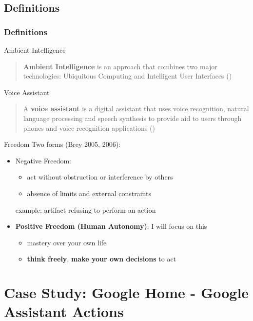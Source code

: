 \documentclass{beamer}
\begin{document}
\subsection{Definitions}
\begin{frame}[allowframebreaks]
\frametitle{Definitions}	
	\begin{block}{Ambient Intelligence}
		\begin{quote}
			\textbf{Ambient Intelligence} is an approach that combines two major technologies: Ubiquitous Computing and Intelligent User Interfaces (\cite{brey2005freedom})
		\end{quote}
	\end{block}

	\begin{block}{Voice Assistant}
		\begin{quote}
			A \textbf{voice assistant} is a digital assistant that uses voice recognition, natural language processing and speech synthesis to provide aid to users through phones and voice recognition applications (\cite{whatis})
		\end{quote}
	\end{block}
	\framebreak
	\begin{block}{Freedom}
		   Two forms (Brey 2005, 2006):
		   
			\begin{itemize}
				\item Negative Freedom:
					\begin{itemize}
						\item act without obstruction or interference by others
						\item absence of limits and external constraints
					\end{itemize}
				example: artifact refusing to perform an action
				    \bigskip
					\item {\small \textbf{Positive Freedom (Human Autonomy)}: I will focus on this}
						\begin{itemize}
							\item mastery over your own life
							\item \textbf{think freely}, \textbf{make your own decisions} to act
						\end{itemize}
			\end{itemize}
			
	\end{block}
\end{frame}

\section{Case Study: Google Home - Google Assistant Actions}
\end{document}
